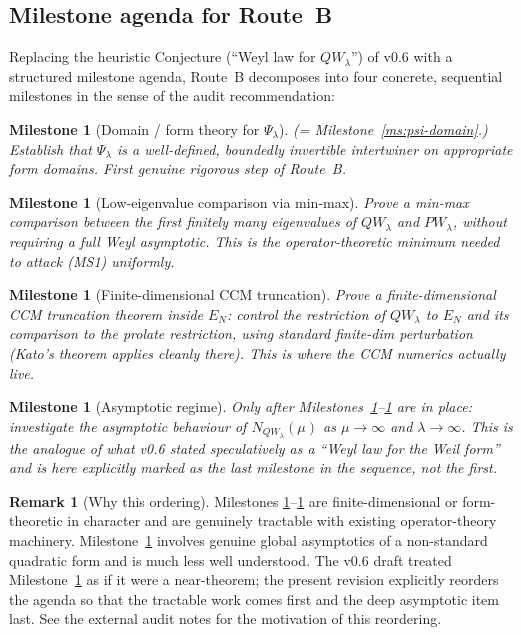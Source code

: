 \documentclass[11pt,a4paper]{article}
\theoremstyle{plain}
\newtheorem{milestone}[theorem]{Milestone}
\theoremstyle{definition}
\newtheorem{remark}[theorem]{Remark}
\begin{document}
\subsection{Milestone agenda for Route~B}
\label{sec:route-b-milestones}

Replacing the heuristic Conjecture (``Weyl law for $QW_\lambda$'') of
v0.6 with a structured milestone agenda, Route~B decomposes into
four concrete, sequential milestones in the sense of the audit
recommendation:

\begin{milestone}[Domain / form theory for $\Psi_\lambda$]
\label{ms:1}
(= Milestone~\ref{ms:psi-domain}.) Establish that $\Psi_\lambda$ is
a well-defined, boundedly invertible intertwiner on appropriate
form domains.  First genuine rigorous step of Route~B.
\end{milestone}

\begin{milestone}[Low-eigenvalue comparison via min-max]
\label{ms:2}
Prove a min-max comparison between the first finitely many
eigenvalues of $QW_\lambda$ and $PW_\lambda$, \emph{without}
requiring a full Weyl asymptotic.  This is the operator-theoretic
minimum needed to attack (MS1) uniformly.
\end{milestone}

\begin{milestone}[Finite-dimensional CCM truncation]
\label{ms:3}
Prove a finite-dimensional CCM truncation theorem inside $E_N$:
control the restriction of $QW_\lambda$ to $E_N$ and its comparison
to the prolate restriction, using standard finite-dim perturbation
(Kato's theorem applies cleanly there).  This is where the CCM
numerics actually live.
\end{milestone}

\begin{milestone}[Asymptotic regime]
\label{ms:4}
Only after Milestones~\ref{ms:1}--\ref{ms:3} are in place:
investigate the asymptotic behaviour of $N_{QW_\lambda}(\mu)$ as
$\mu \to \infty$ and $\lambda \to \infty$.  This is the analogue of
what v0.6 stated speculatively as a ``Weyl law for the Weil form''
and is here explicitly marked as the \emph{last} milestone in the
sequence, not the first.
\end{milestone}

\begin{remark}[Why this ordering]
\label{rem:milestone-ordering}
Milestones \ref{ms:1}--\ref{ms:3} are finite-dimensional or
form-theoretic in character and are genuinely tractable with
existing operator-theory machinery.  Milestone~\ref{ms:4} involves
genuine global asymptotics of a non-standard quadratic form and is
much less well understood.  The v0.6 draft treated Milestone~\ref{ms:4}
as if it were a near-theorem; the present revision explicitly reorders
the agenda so that the tractable work comes first and the deep
asymptotic item last.  See the external audit notes for the
motivation of this reordering.
\end{remark}
\end{document}
